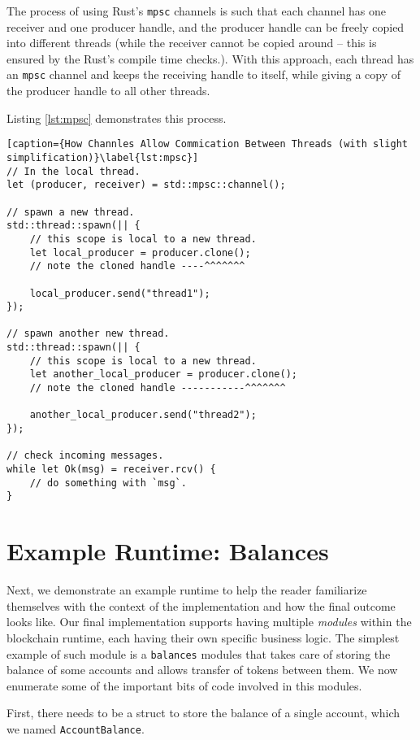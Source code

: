 The process of using Rust's \texttt{mpsc} channels is such that each channel has one receiver and one
producer handle, and the producer handle can be freely copied into different threads (while the
receiver cannot be copied around -- this is ensured by the Rust's compile time checks.). With this
approach, each thread has an \texttt{mpsc} channel and keeps the receiving handle to itself,
while giving a copy of the producer handle to all other threads.

Listing \ref{lst:mpsc} demonstrates this process.

\begin{lstlisting}[caption={How Channles Allow Commication Between Threads (with slight simplification)}\label{lst:mpsc}]
// In the local thread.
let (producer, receiver) = std::mpsc::channel();

// spawn a new thread.
std::thread::spawn(|| {
	// this scope is local to a new thread.
	let local_producer = producer.clone();
	// note the cloned handle ----^^^^^^^

	local_producer.send("thread1");
});

// spawn another new thread.
std::thread::spawn(|| {
	// this scope is local to a new thread.
	let another_local_producer = producer.clone();
	// note the cloned handle -----------^^^^^^^

	another_local_producer.send("thread2");
});

// check incoming messages.
while let Ok(msg) = receiver.rcv() {
	// do something with `msg`.
}
\end{lstlisting}


\section{Example Runtime: Balances} \label{chap_impl:sec:balances}

Next, we demonstrate an example runtime to help the reader familiarize themselves with the context
of the implementation and how the final outcome looks like. Our final implementation supports having
multiple \textit{modules} within the blockchain runtime, each having their own specific business
logic. The simplest example of such module is a \texttt{balances} modules that takes care of storing
the balance of some accounts and allows transfer of tokens between them. We now enumerate some
of the important bits of code involved in this modules.

First, there needs to be a struct to store the balance of a single account, which we named
\texttt{AccountBalance}.


